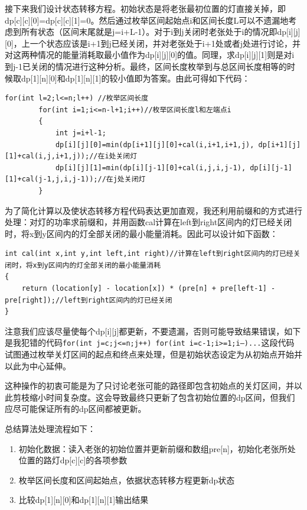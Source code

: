 \documentclass[supercite]{Experimental_Report}
\theoremstyle{definition}
\begin{document}
接下来我们设计状态转移方程。初始状态是将老张最初位置的灯直接关掉，即dp[c][c][0]=dp[c][c][1]=0。然后通过枚举区间起始点i和区间长度L可以不遗漏地考虑到所有状态（区间末尾就是j=i+L-1）。对于i到j关闭时老张处于i的情况即dp[i][j][0]，上一个状态应该是i+1到j已经关闭，并对老张处于i+1处或者j处进行讨论，并对这两种情况的能量消耗取最小值作为dp[i][j][0]的值。同理，求dp[i][j][1]则是对i到j-1已关闭的情况进行这种分析。最终，区间长度枚举到与总区间长度相等的时候取dp[1][n][0]和dp[1][n][1]的较小值即为答案。由此可得如下代码：
\begin{lstlisting}
for(int l=2;l<=n;l++) //枚举区间长度
        for(int i=1;i<=n-l+1;i++)//枚举区间长度l和左端点i
        {
            int j=i+l-1;
            dp[i][j][0]=min(dp[i+1][j][0]+cal(i,i+1,i+1,j), dp[i+1][j][1]+cal(i,j,i+1,j));//在i处关闭灯
            dp[i][j][1]=min(dp[i][j-1][0]+cal(i,j,i,j-1), dp[i][j-1][1]+cal(j-1,j,i,j-1));//在j处关闭灯
        }
\end{lstlisting}

为了简化计算以及使状态转移方程代码表达更加直观，我还利用前缀和的方式进行处理：对灯的功率求前缀和，并用函数cal计算在left到right区间内的灯已经关闭时，将x到y区间内的灯全部关闭的最小能量消耗。因此可以设计如下函数：
\begin{lstlisting}
int cal(int x,int y,int left,int right)//计算在left到right区间内的灯已经关闭时，将x到y区间内的灯全部关闭的最小能量消耗
{
    return (location[y] - location[x]) * (pre[n] + pre[left-1] - pre[right]);//left到right区间内的灯已经关闭
}
\end{lstlisting}

注意我们应该尽量使每个dp[i][j]都更新，不要遗漏，否则可能导致结果错误，如下是我犯错的代码\texttt{for(int j=c;j<=n;j++) for(int i=c-1;i>=1;i--)...}这段代码试图通过枚举关灯区间的起点和终点来处理，但是初始状态设定为从初始点开始并以此为中心延伸。

这种操作的初衷可能是为了只讨论老张可能的路径即包含初始点的关灯区间，并以此剪枝缩小时间复杂度。这会导致最终只更新了包含初始位置的dp区间，但我们应尽可能保证所有的dp区间都被更新。

总结算法处理流程如下：
\begin{enumerate}
\renewcommand{\labelenumi}{\theenumi)}
	\item 初始化数据：读入老张的初始位置并更新前缀和数组pre[n]，初始化老张所处位置的路灯dp[c][c]的各项参数
	\item 枚举区间长度和区间起始点，依据状态转移方程更新dp状态
	\item 比较dp[1][n][0]和dp[1][n][1]输出结果
\end{enumerate}
\end{document}
